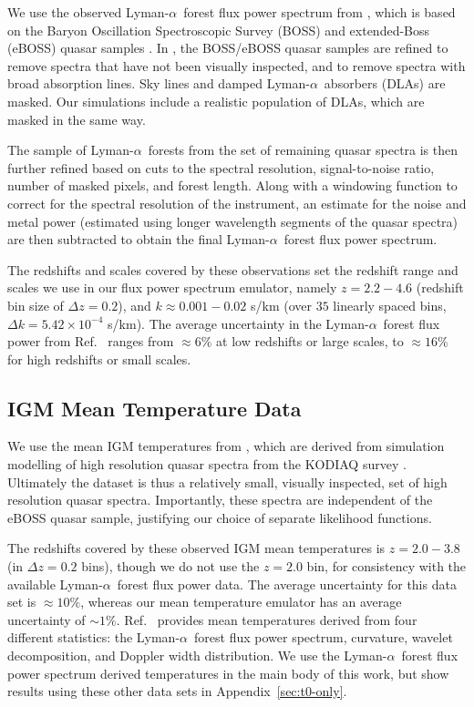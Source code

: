 \documentclass[a4paper,11pt]{article}
\newcommand{\lya}{Lyman-$\alpha$\ }
\begin{document}
We use the observed \lya forest flux power spectrum from \cite{2019JCAP...07..017C}, which is based on the Baryon Oscillation Spectroscopic Survey (BOSS) and extended-Boss (eBOSS) quasar samples \cite{2013AJ....145...10D, 2016AJ....151...44D}.
In \cite{2019JCAP...07..017C}, the BOSS/eBOSS quasar samples are refined to remove spectra that have not been visually inspected, and to remove spectra with broad absorption lines.
Sky lines and damped \lya absorbers (DLAs) are masked. Our simulations include a realistic population of DLAs, which are masked in the same way.

The sample of \lya forests from the set of remaining quasar spectra is then further refined based on cuts to the spectral resolution, signal-to-noise ratio, number of masked pixels, and forest length.
Along with a windowing function to correct for the spectral resolution of the instrument, an estimate for the noise and metal power (estimated using longer wavelength segments of the quasar spectra) are then subtracted to obtain the final \lya forest flux power spectrum.

The redshifts and scales covered by these observations set the redshift range and scales we use in our flux power spectrum emulator, namely $z=2.2-4.6$ (redshift bin size of $\Delta z = 0.2$), and $k\approx0.001-0.02$ s/km (over $35$ linearly spaced bins, $\Delta k = 5.42\times10^{-4}$ s/km).
The average uncertainty in the \lya forest flux power from Ref.~\cite{2019JCAP...07..017C} ranges from $\approx6\%$ at low redshifts or large scales, to $\approx16\%$ for high redshifts or small scales.


\subsection{IGM Mean Temperature Data}\label{sec:t0data}

We use the mean IGM temperatures from \cite{2021MNRAS.506.4389G}, which are derived from simulation modelling of high resolution quasar spectra from the KODIAQ survey \cite{2017AJ....154..114O}. Ultimately the dataset is thus a relatively small, visually inspected, set of high resolution quasar spectra. Importantly, these spectra are independent of the eBOSS quasar sample, justifying our choice of separate likelihood functions.

The redshifts covered by these observed IGM mean temperatures is $z=2.0-3.8$ (in $\Delta z = 0.2$ bins), though we do not use the $z=2.0$ bin, for consistency with the available \lya forest flux power data.
The average uncertainty for this data set is $\approx10\%$, whereas our mean temperature emulator has an average uncertainty of $\sim 1\%$.
Ref.~\cite{2021MNRAS.506.4389G} provides mean temperatures derived from four different statistics: the \lya forest flux power spectrum, curvature, wavelet decomposition, and Doppler width distribution.
We use the \lya forest flux power spectrum derived temperatures in the main body of this work, but show results using these other data sets in Appendix~\ref{sec:t0-only}.
\end{document}
